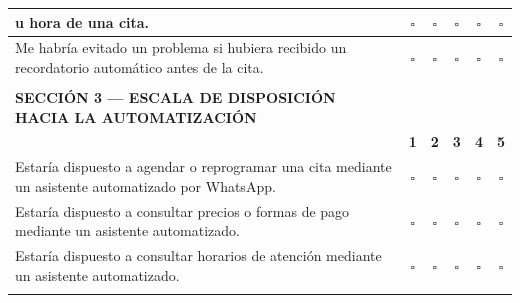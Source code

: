 \begin{longtable}{|p{\fichawidth}|}
\begin{tabular}{|p{0.68\linewidth}|c|c|c|c|c|}
u hora de una cita.
& $\square$ & $\square$ & $\square$ & $\square$ & $\square$ \\ \hline
Me habría evitado un problema si hubiera recibido
un recordatorio automático antes de la cita.
& $\square$ & $\square$ & $\square$ & $\square$ & $\square$ \\ \hline
\end{tabular} \\
\hline
\cellcolor{gray!10}\textbf{SECCIÓN 3 — ESCALA DE DISPOSICIÓN HACIA LA AUTOMATIZACIÓN} \\
\hline
\begin{tabular}{|p{0.68\linewidth}|c|c|c|c|c|}
\hline
\textbf{Afirmación} & \textbf{1} & \textbf{2} & \textbf{3} & \textbf{4} & \textbf{5} \\ \hline
Estaría dispuesto a agendar o reprogramar una cita
mediante un asistente automatizado por WhatsApp.
& $\square$ & $\square$ & $\square$ & $\square$ & $\square$ \\ \hline
Estaría dispuesto a consultar precios o formas de pago
mediante un asistente automatizado.
& $\square$ & $\square$ & $\square$ & $\square$ & $\square$ \\ \hline
Estaría dispuesto a consultar horarios de atención
mediante un asistente automatizado.
& $\square$ & $\square$ & $\square$ & $\square$ & $\square$ \\ \hline
\end{tabular} \\
\hline
\end{longtable}

\vspace{1cm}


